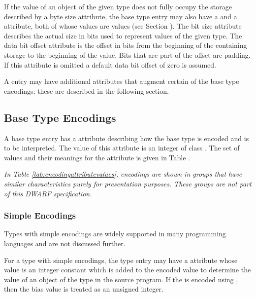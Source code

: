 If the value of an object of the given type does not fully
occupy the storage described by a byte size
attribute,\hypertarget{chap:DWATdatabitoffsetbasetypebitlocation}{}
the base type entry may also have a
\DWATbitsizeDEFN{} and a \DWATdatabitoffsetDEFN{} attribute,
both of whose values are
 values
(see Section ).
The bit size
attribute describes the actual size in bits used to represent
values of the given type. The data bit offset attribute is the
offset in bits from the beginning of the containing storage to
the beginning of the value. Bits that are part of the offset
are padding.
If this attribute is omitted a default data bit offset
of zero is assumed.

A \DWTAGbasetype{} entry may have additional attributes that
augment certain of the base type encodings; these are described
in the following section.

\subsection{Base Type Encodings}
\label{chap:basetypeencodings}
A base type entry has
a \DWATencoding{} attribute describing
how the base type is encoded and is to be interpreted. The
value of this attribute is an integer of class \CLASSconstant.
The set of values and their meanings for the
\DWATencoding{} attribute is given in
Table .

\textit{In Table \ref{tab:encodingattributevalues}, encodings
are shown in groups that have similar characteristics purely
for presentation purposes. These groups are not part of this
DWARF specification.}

\subsubsection{Simple Encodings}
\label{chap:simpleencodings}
Types with simple encodings are widely supported in many
programming languages and are not discussed further.

\label{chap:DWATbiassimpleencodingbias}
\bb
For a type with simple encodings, the type entry may have a \DWATbias{} attribute
whose value is an integer constant which is added to the encoded value to
determine the value of an object of the type in the source program.
If the \DWATbias{} is encoded using \DWFORMdatan{}, then the bias value
is treated as an unsigned integer.
\eb


